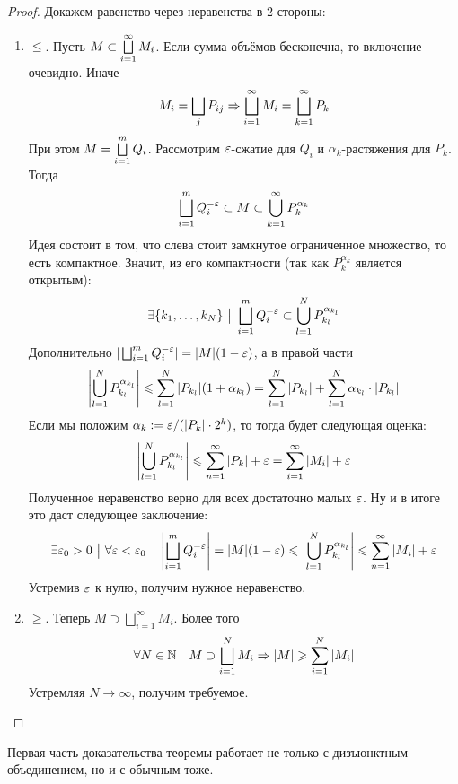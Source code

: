\begin{proof}
	Докажем равенство через неравенства в 2 стороны:
	\begin{enumerate}
		\item $\le$. Пусть $M \subset \bigsqcup\limits_{i = 1}^\infty M_i$. Если сумма объёмов бесконечна, то включение очевидно. Иначе
		\[
			M_i = \bigsqcup\limits_j P_{ij} \Rightarrow \bigsqcup\limits_{i = 1}^\infty M_i = \bigsqcup\limits_{k = 1}^\infty P_k
		\]
		При этом $M = \bigsqcup\limits_{i = 1}^m Q_i$. Рассмотрим $\varepsilon$-сжатие для $Q_i$ и $\alpha_k$-растяжения для $P_k$. Тогда
		\[
			\bigsqcup\limits_{i = 1}^m Q_i^{-\varepsilon} \subset M \subset \bigcup\limits_{k = 1}^\infty P_k^{\alpha_k}
		\]
		Идея состоит в том, что слева стоит замкнутое ограниченное множество, то есть компактное. Значит, из его компактности (так как $P_k^{\alpha_k}$ является открытым):
		\[
			\exists \{k_1, \ldots, k_N\} \ \big|\  \bigsqcup\limits_{i = 1}^m Q_i^{-\varepsilon} \subset \bigcup\limits_{l = 1}^N P_{k_l}^{\alpha_{k_l}}
		\]
		Дополнительно $|\bigsqcup_{i = 1}^m Q_i^{-\varepsilon}| = |M|(1 - \varepsilon)$, а в правой части
		\[
			\left|\bigcup_{l = 1}^N P_{k_l}^{\alpha_{k_l}}\right| \leqslant \sum_{l = 1}^N |P_{k_l}|(1 + \alpha_{k_l}) = \sum\limits_{l = 1}^N |P_{k_l}| + \sum\limits_{l = 1}^N \alpha_{k_l} \cdot |P_{k_l}|
		\]
		Если мы положим $\alpha_k := \varepsilon / (|P_k| \cdot 2^k)$, то тогда будет следующая оценка:
		\[
			\left|\bigcup_{l = 1}^N P_{k_l}^{\alpha_{k_l}}\right| \leqslant \sum_{n = 1}^\infty |P_k| + \varepsilon = \sum\limits_{i = 1}^\infty |M_i| + \varepsilon
		\]
		Полученное неравенство верно для всех достаточно малых $\varepsilon$. Ну и в итоге это даст следующее заключение:
		\[
			\exists \varepsilon_0 > 0 \ \big|\  \forall \varepsilon < \varepsilon_0 \quad \left|\bigsqcup\limits_{i = 1}^m Q_i^{-\varepsilon}\right| = |M|(1 - \varepsilon) \leqslant \left|\bigcup_{l = 1}^N P_{k_l}^{\alpha_{k_l}}\right| \leqslant \sum_{n = 1}^\infty |M_i| + \varepsilon
		\]
		Устремив $\varepsilon$ к нулю, получим нужное неравенство.
		
		\item $\ge$. Теперь $M \supset \bigsqcup_{i = 1}^\infty M_i$. Более того
		\[
			\forall N \in \mathbb{N} \quad M \supset \bigsqcup_{i = 1}^N M_i \Rightarrow |M| \geqslant \sum\limits_{i = 1}^N |M_i|
		\]
		Устремляя $N \to \infty$, получим требуемое.
	\end{enumerate}
\end{proof}

\begin{note}
	Первая часть доказательства теоремы работает не только с дизъюнктным объединением, но и с обычным тоже.
\end{note}